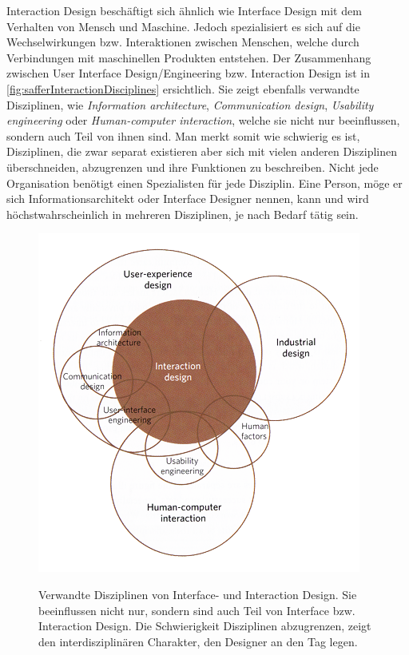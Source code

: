 \medskip Interaction Design beschäftigt sich ähnlich wie Interface Design mit dem Verhalten von Mensch und Maschine. Jedoch spezialisiert es sich auf die Wechselwirkungen bzw. Interaktionen zwischen Menschen, welche durch Verbindungen mit maschinellen Produkten entstehen. Der Zusammenhang zwischen User Interface Design/Engineering bzw. Interaction Design ist in \autoref{fig:safferInteractionDisciplines} ersichtlich. Sie zeigt ebenfalls verwandte Disziplinen, wie \emph{Information architecture}, \emph{Communication design}, \emph{Usability engineering} oder \emph{Human-computer interaction}, welche sie nicht nur beeinflussen, sondern auch Teil von ihnen sind. Man merkt somit wie schwierig es ist, Disziplinen, die zwar separat existieren aber sich mit vielen anderen Disziplinen überschneiden, abzugrenzen und ihre Funktionen zu beschreiben. Nicht jede Organisation benötigt einen Spezialisten für jede Disziplin. Eine Person, möge er sich Informationsarchitekt oder Interface Designer nennen, kann und wird höchstwahrscheinlich in mehreren Disziplinen, je nach Bedarf tätig sein. \citep{Saffer:2007}

\begin{figure}
	\begin{center}
        {\includegraphics[width=.8\linewidth]{gfx/safferInteractionDisciplines}}
	\end{center}
		\caption[Verwandte Disziplinen von Interface- und Interaction Design \newline \citep{Saffer:2006}]{Verwandte Disziplinen von Interface- und Interaction Design. Sie beeinflussen nicht nur, sondern sind auch Teil von Interface bzw. Interaction Design. Die Schwierigkeit	Disziplinen abzugrenzen, zeigt den interdisziplinären Charakter, den Designer an den Tag legen.}\label{fig:safferInteractionDisciplines}
\end{figure}

